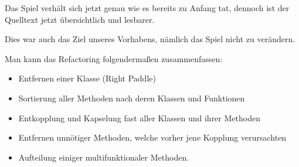 \documentclass{pi1}
\begin{document}
Das Spiel verhält sich jetzt genau wie es bereits zu Anfang tat, dennoch ist der Quelltext jetzt übersichtlich und lesbarer.\newline

Dies war auch das Ziel unseres Vorhabens, nämlich das Spiel nicht zu verändern. \newline

Man kann das Refactoring folgendermaßen zusammenfassen:
\begin{itemize}


\item Entfernen einer Klasse (Right Paddle)
\item Sortierung aller Methoden nach deren Klassen und Funktionen
\item Entkopplung und Kapselung fast aller Klassen und ihrer Methoden
\item Entfernen unnötiger Methoden, welche vorher jene Kopplung verursachten
\item Aufteilung einiger multifunktionaler Methoden.
\end{itemize}
\end{document}
